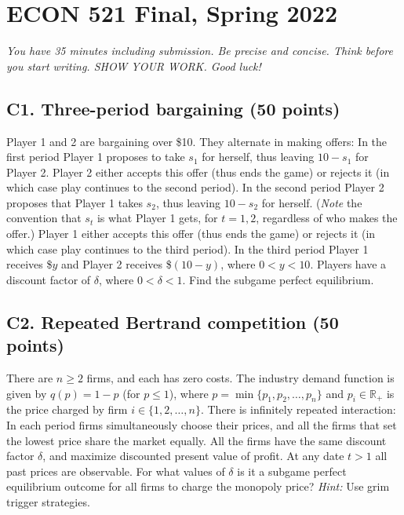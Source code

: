 \documentclass[11pt]{article}
\newcommand{\pts}[1]{\textbf{(#1 points)}}
\begin{document}
\section*{ECON 521 Final, Spring 2022}
\textit{You have 35 minutes including submission. Be precise and concise. Think before you start writing. SHOW YOUR WORK. Good luck!}

\subsection*{C1. Three-period bargaining \pts{50}}
Player 1 and 2 are bargaining over \$10. They alternate in making offers: In the first period Player 1 proposes to take $s_1$ for herself, thus leaving $10-s_1$ for Player 2. Player 2 either accepts this offer (thus ends the game) or rejects it (in which case play continues to the second period). In the second period Player 2 proposes that Player 1 takes $s_2$, thus leaving $10-s_2$ for herself. (\emph{Note} the convention that $s_t$ is what Player 1 gets, for $t=1,2$, regardless of who makes the offer.) Player 1 either accepts this offer (thus ends the game) or rejects it (in which case play continues to the third period). In the third period Player 1 receives \$$y$ and Player 2 receives \$$(10-y)$, where $0<y<10$. Players have a discount factor of $\delta$, where $0<\delta<1$. Find the subgame perfect equilibrium.

\subsection*{C2. Repeated Bertrand competition \pts{50}}
There are $n\ge 2$ firms, and each has zero costs. The industry demand function is given by $q(p)=1-p$ (for $p\le 1$), where $p=\min\{p_1,p_2,\dots,p_n\}$ and $p_i\in\mathbb{R}_+$ is the price charged by firm $i\in\{1,2,\dots,n\}$. There is infinitely repeated interaction: In each period firms simultaneously choose their prices, and all the firms that set the lowest price share the market equally. All the firms have the same discount factor $\delta$, and maximize discounted present value of profit. At any date $t>1$ all past prices are observable. For what values of $\delta$ is it a subgame perfect equilibrium outcome for all firms to charge the monopoly price? \emph{Hint:} Use grim trigger strategies.

\newpage
\end{document}
